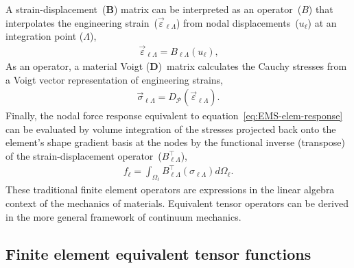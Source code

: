 \documentclass[]             %
{NASA}                       %
\begin{document}
A strain-displacement~($\mathbf{B}$) matrix can be interpreted as an operator~($B$)
that interpolates the engineering strain~($\vec{\varepsilon}_{\ell\Lambda}$)
from nodal displacements~($u_{\ell}$) at an integration point ($\Lambda$),
\begin{eqnarray}
\vec{\varepsilon}_{\ell\Lambda} = B_{\ell\Lambda}(u_{\ell})\text{,}\label{eq:small-strain}
\end{eqnarray}
As an operator, a material Voigt ($\mathbf{D}$)~matrix calculates the Cauchy stresses from a Voigt vector representation of engineering strains,
\begin{eqnarray}
\vec{\sigma}_{\ell\Lambda} = D_{\mathcal{P}}(\vec{\varepsilon}_{\ell\Lambda})\text{.}
\end{eqnarray}
Finally, the nodal force response equivalent to equation~\ref{eq:EMS-elem-response}
can be evaluated by volume integration of the stresses projected back onto
 the element's shape gradient basis at the nodes by the functional inverse (transpose) of the strain-displacement operator~($B_{\ell\Lambda}^{\top}$),
\begin{eqnarray}
f_{\ell} = \int_{\Omega_{\ell}}B_{\ell\Lambda}^{\top}(\sigma_{\ell\Lambda})d\Omega_{\ell}\text{.}
\end{eqnarray}
These traditional finite element operators are expressions in the linear
 algebra context of the mechanics of materials.
 Equivalent tensor operators can be derived in the more general framework
 of continuum mechanics.
 
\subsection{Finite element equivalent tensor functions}
\end{document}
